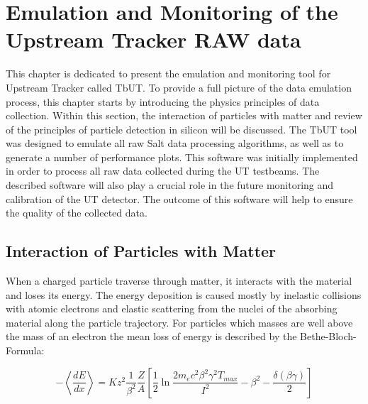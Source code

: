 \chapter{Emulation and Monitoring of the Upstream Tracker RAW data}
\label{chapter:tbut}

This chapter is dedicated to present the emulation and monitoring tool for Upstream Tracker called TbUT.
To provide a full picture of the data emulation process, this chapter starts by introducing the physics principles of data collection. Within this section, the interaction of particles with matter and review of the principles of particle detection in silicon will be discussed.    
The TbUT tool was designed to emulate all raw Salt data processing algorithms, as well as to generate a number of performance plots. This software was initially implemented in order to process all raw data collected during the UT testbeams. The described software will also play a crucial role in the future monitoring and calibration of the UT detector. The outcome of this software will help to ensure the quality of the collected data. 


\section{Interaction of Particles with Matter}
\label{sec:Interaction}
When a charged particle traverse through matter, it interacts with the material and loses its energy. The energy deposition is caused mostly by inelastic collisions with atomic electrons and elastic scattering from the nuclei of the absorbing material along the particle trajectory. For particles which masses are well above the mass of an electron the mean loss of energy is described by the Bethe-Bloch-Formula: 

\begin{equation}
\label{eq:Bethe_bloh}
  -\left< \frac{dE}{dx} \right> = K z^2 \frac{1}{\beta^2} \frac{Z}{A} 
  \left[ \frac{1}{2} \ln \frac{2m_e c^2 \beta^2 \gamma^2 T_{max}}{I^2} - \beta^2 - \frac{\delta(\beta \gamma)}{2}
  \right]  
\end{equation}

